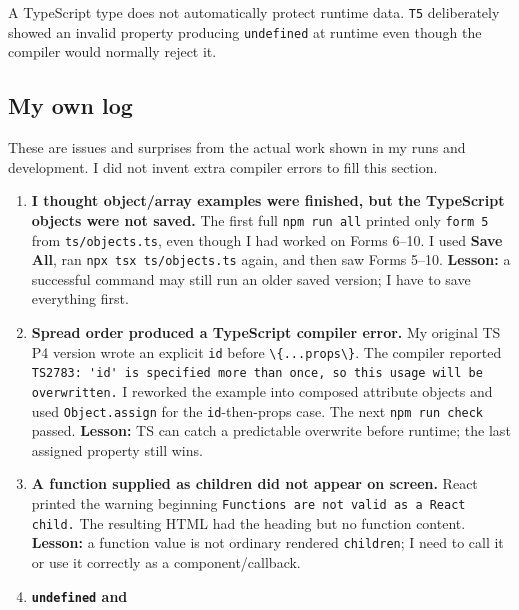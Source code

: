 \documentclass[
  9pt,
]{article}
\newcommand{\passthrough}[1]{#1}
\begin{document}
A TypeScript type does not automatically protect runtime data.
\passthrough{\lstinline!T5!} deliberately showed an invalid property
producing \passthrough{\lstinline!undefined!} at runtime even though the
compiler would normally reject it.

\subsection{My own log}\label{my-own-log}

These are issues and surprises from the actual work shown in my runs and
development. I did not invent extra compiler errors to fill this
section.

\begin{enumerate}
\def\labelenumi{\arabic{enumi}.}
\item
  \textbf{I thought object/array examples were finished, but the
  TypeScript objects were not saved.} The first full
  \passthrough{\lstinline!npm run all!} printed only
  \passthrough{\lstinline!form 5!} from
  \passthrough{\lstinline!ts/objects.ts!}, even though I had worked on
  Forms 6--10. I used \textbf{Save All}, ran
  \passthrough{\lstinline!npx tsx ts/objects.ts!} again, and then saw
  Forms 5--10. \textbf{Lesson:} a successful command may still run an
  older saved version; I have to save everything first.
\item
  \textbf{Spread order produced a TypeScript compiler error.} My
  original TS P4 version wrote an explicit \passthrough{\lstinline!id!}
  before \passthrough{\lstinline!\{...props\}!}. The compiler reported
  \passthrough{\lstinline!TS2783: 'id' is specified more than once, so this usage will be overwritten.!}
  I reworked the example into composed attribute objects and used
  \passthrough{\lstinline!Object.assign!} for the
  \passthrough{\lstinline!id!}-then-props case. The next
  \passthrough{\lstinline!npm run check!} passed. \textbf{Lesson:} TS
  can catch a predictable overwrite before runtime; the last assigned
  property still wins.
\item
  \textbf{A function supplied as children did not appear on screen.}
  React printed the warning beginning
  \passthrough{\lstinline!Functions are not valid as a React child.!}
  The resulting HTML had the heading but no function content.
  \textbf{Lesson:} a function value is not ordinary rendered
  \passthrough{\lstinline!children!}; I need to call it or use it
  correctly as a component/callback.
\item
  \textbf{\passthrough{\lstinline!undefined!} and
}
\end{enumerate}
\end{document}
